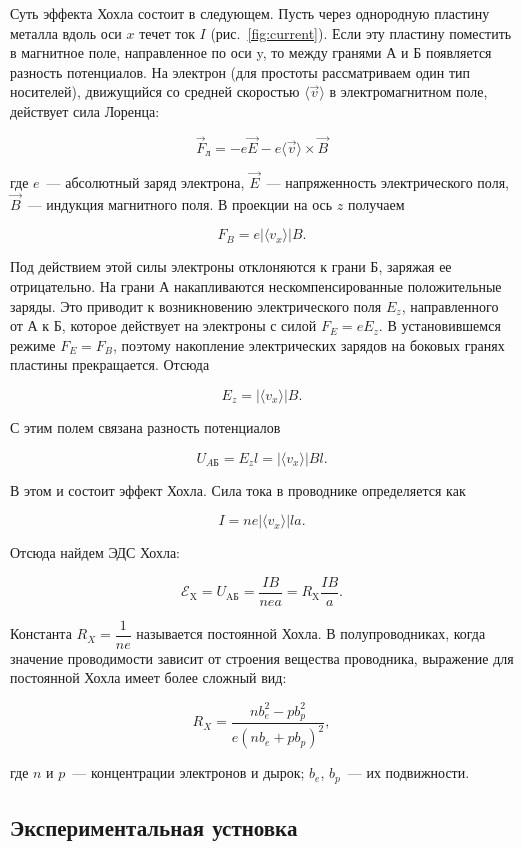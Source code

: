 \documentclass[a4paper,12pt]{article} %
\begin{document}
Суть эффекта Хохла состоит в следующем. Пусть через однородную пластину металла вдоль оси $x$ течет ток $I$ (рис.~\ref{fig:current}). Если эту пластину поместить в магнитное поле, направленное по оси y, то между гранями А и Б появляется разность потенциалов. На электрон (для простоты рассматриваем один тип носителей), движущийся со средней скоростью $\langle \vec{v} \rangle$ в электромагнитном поле, действует сила Лоренца:
	
$$\vec{F}_{л} = -e\vec{E}-e \langle \vec{v} \rangle \times \vec{B}$$
	
где $e$~--- абсолютный заряд электрона, $\vec{E}$~--- напряженность электрического поля, $\vec{B}$~--- индукция магнитного поля. В проекции на ось $z$ получаем

$$ F_{B}=e | \langle {v_{x}} \rangle | B.$$
	
Под действием этой силы электроны отклоняются к грани Б, заряжая ее отрицательно. На грани А накапливаются нескомпенсированные положительные заряды. Это приводит к возникновению электрического поля $E_{z}$, направленного от А к Б, которое действует на электроны с силой $F_{E}=eE_{z}$. В установившемся режиме $F_{E}=F_{B}$, поэтому накопление электрических зарядов на боковых гранях пластины прекращается. Отсюда
	
$$ E_{z}=| \langle {v_{x}} \rangle | B.$$
	
С этим полем связана разность потенциалов 

$$U_{AБ}=E_{z}l=| \langle {v_{x}} \rangle | Bl.$$
	
В этом и состоит эффект Хохла. Сила тока в проводнике определяется как
	
$$ I=ne| \langle {v_{x}} \rangle |la.$$
	
Отсюда найдем ЭДС Хохла:
	
\begin{equation}\label{Rx}
	\mathscr{E}_\text{X}=U_\text{AБ}=\dfrac{IB}{nea}=R_\text{X}\dfrac{IB}{a}.
\end{equation}
	
Константа $R_{X}=\dfrac{1}{ne}$ называется постоянной Хохла. В полупроводниках, когда значение проводимости зависит от строения вещества проводника, выражение для постоянной Хохла имеет более сложный вид:
	
$$R_{X}=\dfrac{nb^{2}_{e}-pb^{2}_{p}}{e(nb_{e}+pb_{p})^{2}},$$
	
где $n$ и $p$~--- концентрации электронов и дырок; $b_{e}$, $b_{p}$~--- их подвижности.

\subsection{Экспериментальная устновка}
\end{document}

